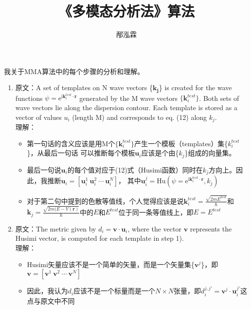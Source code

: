 \documentclass[UTF8]{ctexart}
\title{《多模态分析法》算法}
\author{邴泓霖}
\date{}
\begin{document}
\maketitle

{\large \heiti 我关于MMA算法中的每个步骤的分析和理解}。
\begin{enumerate}
%
\item {\heiti 原文}：A set of \textcolor{blue!90}{templates} on N wave vectors \{$\mathbf{k_j}$\} is 
                created for the wave functions $\psi=\mathrm{e}^{\mathrm{i}\mathbf{k}_{i}^{test}\cdot\mathbf{r}}$ 
                generated by the M wave vectors $\{\mathbf{k}_{i}^{test}\}$. Both sets of wave vectors lie along the 
                dispersion contour. Each \textcolor{blue!90}{template} is stored as a vector of values $u_i$ (length M) 
                and corresponds to eq. (12) along $k_j$.\\
    {\heiti 理解}：
    \begin{itemize}
    \item 第一句话的含义应该是用M个$\{\mathbf{k}_{i}^{test}\}$产生一个模板（templates）集\{$k_{i}^{test}$\}，从最后一句话
        可以推断每个模板$\mathbf{u}_i$应该是个由\{$k_j$\}组成的向量集。
    \item 最后一句说$\mathbf{u}_i$的每个值对应于(12)式（Husimi函数）同时在$k_j$方向上。因此，我推断$\mathbf{u}_i = [ \mathbf{u}_i^{1}\ \mathbf{u}_i^{2}\ \cdots\ \mathbf{u}_i^{N}]$，
        其中$\mathbf{u}_i^{j}=\mathrm{Hu}(\psi=\mathrm{e}^{\mathrm{i}\mathbf{k}_{i}^{test}\cdot\mathbf{r}},k_j)$
    \item 对于第二句中提到的色散等值线，个人觉得应该是说$\mathbf{k}_{i}^{test}=\frac{\sqrt{2mE^{test}}}{\hbar}$和
            $\mathbf{k}_{j}=\frac{\sqrt{2m(E-V(\mathbf{r})}}{\hbar}$中的$E$和$E^{test}$位于同一条等值线上，即$E=E^{test}$
    \end{itemize}
%
\item {\heiti 原文}：The metric given by $d_i=\mathbf{v}\cdot\mathbf{u}_i$, where the vector $\mathbf{v}$ represents the \textcolor{red!80}{Husimi vector}, is computed for
                    each \textcolor{blue!90}{template} in step 1).\\
        {\heiti 理解}：
        \begin{itemize}
            \item Husimi矢量应该不是一个简单的矢量，而是一个矢量集\{$\mathbf{v}^{j}$\}，即$\mathbf{v}=[\mathbf{v}^1\ \mathbf{v}^2\ \cdots\ \mathbf{v}^N]$
            \item 因此，我认为$d_i$应该不是一个标量而是一个$N\times N$张量，即$d_i^{j,j'}=\mathbf{v}^{j}\cdot\mathbf{u}_{i}^{j'}$\colorbox{red!60}{这点与原文中不同}

\end{itemize}
\end{enumerate}
\end{document}
